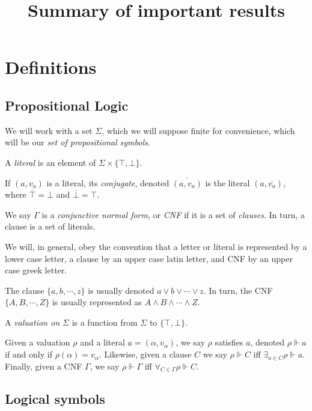 \documentclass[11pt]{article}
\title{Summary of important results}
\author{}
\date{}
\newcommand{\conj}[1]{\overline{#1}}
\newcommand{\sat}{\Vdash}
\begin{document}
\maketitle

\tableofcontents

\section{Definitions}

\subsection{Propositional Logic}

We will work with a set $\Sigma$, which we will suppose finite for convenience, which will be our \emph{set of propositional symbols}.

A \emph{literal} is an element of $\Sigma \times \{\top, \bot\}$.

If $(a, v_a)$ is a literal, its \emph{conjugate}, denoted $\conj{(a,v_a)}$ is the literal $(a, \conj{v_a})$, where $\conj \top = \bot$ and $\conj \bot = \top$.

We say $\Gamma$ is a \emph{conjunctive normal form}, or \emph{CNF} if it is a set of \emph{clauses}. In turn, a clause is a set of literals.

We will, in general, obey the convention that a letter or literal is represented by a lower case letter, a clause by an upper case latin letter, and CNF by an upper case greek letter.

The clause $\{a,b,\cdots,z\}$ is usually denoted $a \vee b \vee \cdots \vee z$. In turn, the CNF $\{A, B, \cdots, Z\}$ is usually represented as $A \wedge B \wedge \cdots \wedge Z$.

A \emph{valuation on $\Sigma$} is a function from $\Sigma$ to $\{\top, \bot\}$.

Given a valuation $\rho$ and a literal $a = (\alpha, v_\alpha)$, we say $\rho$ satisfies $a$, denoted $\rho \sat a$ if and only if $\rho(\alpha) = v_\alpha$. Likewise, given a clause $C$ we say $\rho \sat C$ iff $\exists_{a \in C} \rho \sat a$. Finally, given a CNF $\Gamma$, we say $\rho \sat \Gamma$ iff $\forall_{C \in \Gamma} \rho \sat C$.


\subsection{Logical symbols}
\end{document}

